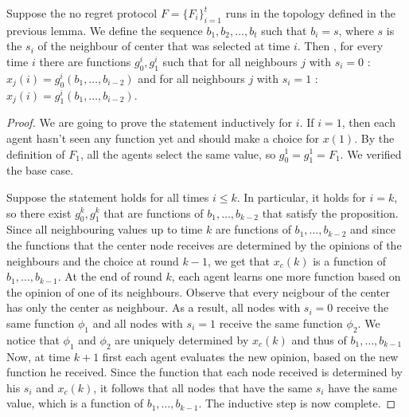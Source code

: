 \begin{lemma}\label{l:help}
Suppose the no regret protocol $F = \{F_i\}_{i=1}^t $ runs in the topology defined in the previous lemma. We define the sequence $b_1, b_2, \ldots , b_t$ such that 
$b_i = s$, where $s$ is the $s_i$ of the neighbour of center that was selected at time $i$. Then , for every time $i$ there are functions $g_0^i, g_1^i$ such that for all neighbours $j$ with $s_i = 0$ :
$x_j(i) = g_0^i(b_1,\ldots, b_{i-2})$ and for all neighbours $j$ with $s_i = 1$ :
$x_j(i) = g_1^i(b_1,\ldots, b_{i-2})$.
\end{lemma}
\begin{proof}
We are going to prove the statement inductively for $i$. If $i=1$, then each agent hasn't seen any function yet and should make a choice for $x(1)$.
 By the definition of $F_1$, all the agents select the same value, so $g_0^1 = g_1^1 = F_1$. We verified the base case.

Suppose the statement holds for all times $i \leq k$. In particular, it holds for $i = k$, so there exist $g_0^k, g_1^k$ 
that are functions of $b_1,\ldots, b_{k-2}$ that satisfy the proposition. Since all neighbouring values up to time $k$ are functions of $b_1,\ldots, b_{k-2}$
and since the functions that the center node receives are determined by the opinions of the neighbours and the choice at round $k-1$,
we get that $x_c(k)$ is a function of $b_1,\ldots, b_{k-1}$. At the end of round $k$, each agent learns one more function
based on the opinion of one of its neighbours. Observe that every neigbour of the center has only the center as neighbour. As a result, all nodes
with $s_i = 0$ receive the same function $\phi_1$ and all nodes with $s_i = 1$ receive the same function $\phi_2$. We notice that $\phi_1$ and $\phi_2$ are uniquely determined by $x_c(k)$ and thus of $b_1,\ldots, b_{k-1}$\\
Now, at time $k+1$ first each agent evaluates the new opinion, based on the new function he received. Since the function that each node received 
is determined by his $s_i$ and $x_c(k)$, it follows that all nodes that have the same $s_i$ have the same value, which is a function of $b_1,\ldots, b_{k-1}$. The inductive step is now complete. 
\end{proof}
